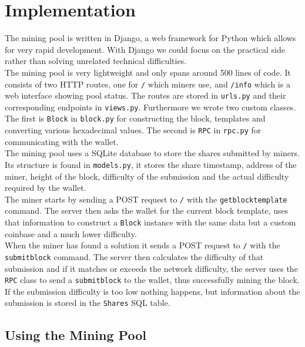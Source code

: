 \section{Implementation}

The mining pool is written in Django, a web framework for Python which allows for very rapid development. With Django we could focus on the practical side rather than solving unrelated technical difficulties. \\

The mining pool is very lightweight and only spans around 500 lines of code. It consists of two HTTP routes, one for \texttt{/} which miners use, and \texttt{/info} which is a web interface showing pool status. The routes are stored in \texttt{urls.py} and their corresponding endpoints in \texttt{views.py}. Furthermore we wrote two custom classes. The first is \texttt{Block} in \texttt{block.py} for constructing the block, templates and converting various hexadecimal values. The second is \texttt{RPC} in \texttt{rpc.py} for communicating with the wallet. \\

The mining pool uses a SQLite database to store the shares submitted by miners. Its structure is found in \texttt{models.py}, it stores the share timestamp, address of the miner, height of the block, difficulty of the submission and the actual difficulty required by the wallet. \\

The miner starts by sending a POST request to \texttt{/} with the \texttt{getblocktemplate} command. The server then asks the wallet for the current block template, uses that information to construct a \texttt{Block} instance with the same data but a custom coinbase and a much lower difficulty. \\

When the miner has found a solution it sends a POST request to \texttt{/} with the \texttt{submitblock} command. The server then calculates the difficulty of that submission and if it matches or exceeds the network difficulty, the server uses the \texttt{RPC} class to send a \texttt{submitblock} to the wallet, thus successfully mining the block. If the submission difficulty is too low nothing happens, but information about the submission is stored in the \texttt{Shares} SQL table.

\subsection{Using the Mining Pool}

